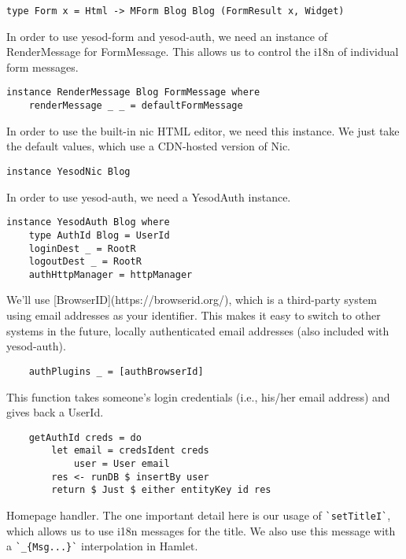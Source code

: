 \begin{lstlisting}
type Form x = Html -> MForm Blog Blog (FormResult x, Widget)
\end{lstlisting}

In order to use yesod-form and yesod-auth, we need an instance of RenderMessage for FormMessage. This allows us to control the i18n of individual form messages.

\begin{lstlisting}
instance RenderMessage Blog FormMessage where
    renderMessage _ _ = defaultFormMessage
\end{lstlisting}

In order to use the built-in nic HTML editor, we need this instance. We just take the default values, which use a CDN-hosted version of Nic.

\begin{lstlisting}
instance YesodNic Blog
\end{lstlisting}

In order to use yesod-auth, we need a YesodAuth instance.

\begin{lstlisting}
instance YesodAuth Blog where
    type AuthId Blog = UserId
    loginDest _ = RootR
    logoutDest _ = RootR
    authHttpManager = httpManager
\end{lstlisting}

We'll use [BrowserID](https://browserid.org/), which is a third-party system using email addresses as your identifier. This makes it easy to switch to other systems in the future, locally authenticated email addresses (also included with yesod-auth).

\begin{lstlisting}
    authPlugins _ = [authBrowserId]
\end{lstlisting}

This function takes someone's login credentials (i.e., his/her email address) and gives back a UserId.

\begin{lstlisting}
    getAuthId creds = do
        let email = credsIdent creds
            user = User email
        res <- runDB $ insertBy user
        return $ Just $ either entityKey id res
\end{lstlisting}

Homepage handler. The one important detail here is our usage of \lstinline'`setTitleI`', which allows us to use i18n messages for the title. We also use this message with a \lstinline'`_{Msg...}`' interpolation in Hamlet.

